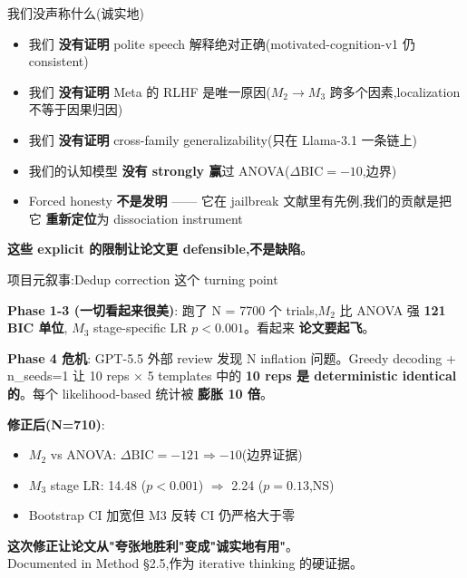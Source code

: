 \documentclass[aspectratio=169,11pt]{ctexbeamer}
\newcommand{\hi}[1]{\textcolor{ow-red}{\textbf{#1}}}
\newcommand{\hib}[1]{\textcolor{ow-blue}{\textbf{#1}}}
\newcommand{\sub}[1]{{\small\color{ow-gray}#1}}
\begin{document}
\begin{frame}{我们没声称什么(诚实地)}
\begin{itemize}\setlength{\itemsep}{0.5em}
\item 我们 \textbf{没有证明} polite speech 解释绝对正确(motivated-cognition-v1 仍 consistent)
\item 我们 \textbf{没有证明} Meta 的 RLHF 是唯一原因($M_2 \to M_3$ 跨多个因素,localization 不等于因果归因)
\item 我们 \textbf{没有证明} cross-family generalizability(只在 Llama-3.1 一条链上)
\item 我们的认知模型 \textbf{没有 strongly 赢}过 ANOVA($\Delta\text{BIC} = -10$,边界)
\item Forced honesty \textbf{不是发明} —— 它在 jailbreak 文献里有先例,我们的贡献是把它 \hib{重新定位}为 dissociation instrument
\end{itemize}

\bigskip
\hi{这些 explicit 的限制让论文更 defensible,不是缺陷}。
\end{frame}

\begin{frame}{项目元叙事:Dedup correction 这个 turning point}

\textbf{Phase 1-3 (一切看起来很美)}:
跑了 N = 7700 个 trials,$M_2$ 比 ANOVA 强 \hi{121 BIC 单位}, $M_3$ stage-specific LR $p < 0.001$。看起来 \hib{论文要起飞}。

\bigskip
\textbf{Phase 4 危机}:
GPT-5.5 外部 review 发现 N inflation 问题。Greedy decoding + n\_seeds=1 让 10 reps × 5 templates 中的 \hi{10 reps 是 deterministic identical 的}。每个 likelihood-based 统计被 \hi{膨胀 10 倍}。

\bigskip
\textbf{修正后(N=710)}:
\begin{itemize}\setlength{\itemsep}{0pt}
\item $M_2$ vs ANOVA: $\Delta\text{BIC} = -121 \Rightarrow -10$(边界证据)
\item $M_3$ stage LR: 14.48 ($p < 0.001$) $\Rightarrow$ 2.24 ($p = 0.13$,NS)
\item Bootstrap CI 加宽但 M3 反转 CI 仍严格大于零
\end{itemize}

\bigskip
\hi{这次修正让论文从"夸张地胜利"变成"诚实地有用"}。\\
\sub{Documented in Method §2.5,作为 iterative thinking 的硬证据。}
\end{frame}
\end{document}
